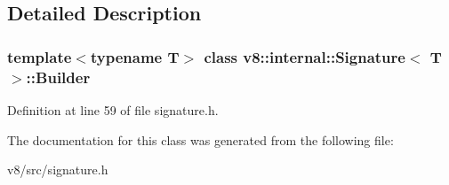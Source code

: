 \subsection{Detailed Description}
\subsubsection*{template$<$typename T$>$\newline
class v8\+::internal\+::\+Signature$<$ T $>$\+::\+Builder}



Definition at line 59 of file signature.\+h.



The documentation for this class was generated from the following file\+:\begin{DoxyCompactItemize}
\item 
v8/src/signature.\+h\end{DoxyCompactItemize}
